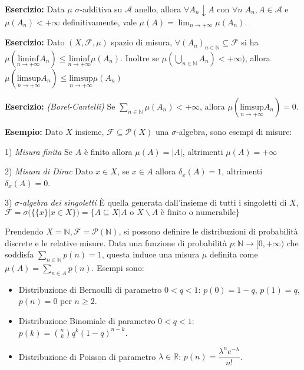 {\bf Esercizio: } Data $\mu$ $\sigma$-additiva su $\mathcal{A}$ anello, allora $\forall A_n \downarrow A$ con $\forall n\; A_n,A \in \mathcal{A}$ e $\mu(A_n) < + \infty$ definitivamente, vale $\mu(A)=\lim_{n\rightarrow +\infty} \mu(A_n)$.
\vspace{0.3cm}

{\bf Esercizio: } Dato $(X,\mathcal{F}, \mu)$ spazio di misura, $\forall (A_n)_{n\in\mathbb{N}}\subseteq\mathcal{F}$  si ha $\mu(\underset{n\rightarrow +\infty}{\text{liminf}} A_n) \leq \underset{n\rightarrow +\infty}{\text{liminf}} \mu (A_n)$. Inoltre se $\mu(\underset{n\in\mathbb{N}}{\bigcup} A_n) <+\infty)$, allora $\mu(\underset{n\rightarrow +\infty}{\text{limsup}} A_n) \leq \underset{n\rightarrow +\infty}{\text{limsup}} \mu (A_n)$
 \vspace{0.3cm}

{\bf Esercizio: } {\it (Borel-Cantelli)} Se $\sum\limits_{n\in\mathbb{N}} \mu(A_n) < +\infty$, allora $\mu(\underset{n\rightarrow +\infty}{\text{limsup}} A_n)=0$.

\vspace{0.5cm}

{\bf Esempio: } Dato $X$ insieme, $\mathcal{F}\subseteq \mathscr{P}(X)$ una $\sigma$-algebra, sono esempi di misure:

1) {\it Misura finita} Se $A$ è finito allora $\mu(A)=|A|$, altrimenti $\mu(A)=+\infty$

2) {\it Misura di Dirac} Dato $x\in X$, se $x\in A$ allora $\delta_x(A)=1$, altrimenti $\delta_x(A)=0$.

3) {\it $\sigma$-algebra dei singoletti} È quella generata dall'insieme di tutti i singoletti di $X$,  $\mathcal{F}=\sigma(\{ \{x\} | x\in X\}) =\{A\subseteq X | A \text{ o } X\backslash A \text{ è finito o numerabile} \}$

\vspace{0.4cm}
Prendendo $X=\mathbb{N}, \mathcal{F} =\mathscr{P}(\mathbb{N})$, si possono definire le distribuzioni di probabilità discrete e le relative misure. Data una funzione di probabilità $p: \mathbb{N} \rightarrow [0,+\infty)$ che soddisfa $\sum\limits_{n\in\mathbb{N}} p(n)=1$, questa induce una misura $\mu$ definita come $\mu(A)=\sum\limits_{n\in A} p(n)$. Esempi sono:
 \begin{itemize}
  \item Distribuzione di Bernoulli di parametro $0<q<1$: $p(0)=1-q$, $p(1)=q$, $p(n)=0$ per $n\geq 2$.
 
\item Distribuzione Binomiale di parametro $0<q<1$: $p(k)=\displaystyle\binom{n}{k} q^k (1-q)^{n-k}$.
 
 \item Distribuzione di Poisson di parametro $\lambda\in\mathbb{R}$: $p(n)=\dfrac{\lambda^ne^{-\lambda}}{n!}$.
\end{itemize}

